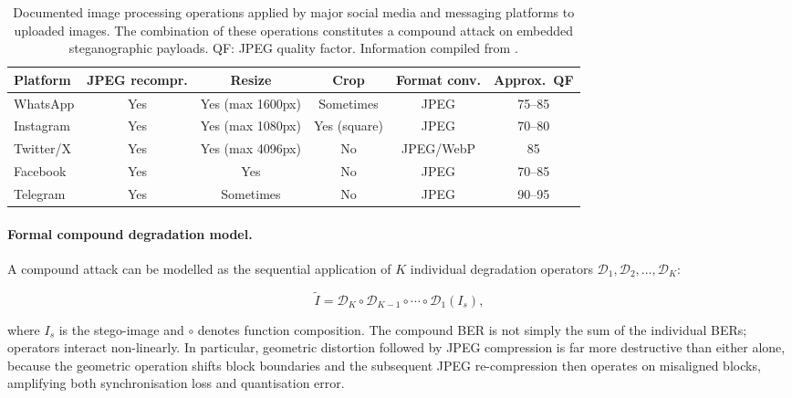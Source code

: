 \documentclass[12pt,a4paper,oneside]{report}
\begin{document}
	\begin{table}[htbp]
		\centering
		\caption{Documented image processing operations applied by major social media and messaging
			platforms to uploaded images. The combination of these operations constitutes a
			compound attack on embedded steganographic payloads. QF: JPEG quality factor.
			Information compiled from \cite{jia2021mbrs, wengrowski2019light,
				petitcolas1999information}.}
		\label{tab:platform_pipelines}
		\renewcommand{\arraystretch}{1.3}
		\small
		\begin{tabular}{@{} l c c c c c @{}}
			\toprule
			\textbf{Platform} & \textbf{JPEG recompr.} & \textbf{Resize} &
			\textbf{Crop} & \textbf{Format conv.} & \textbf{Approx.\ QF} \\
			\midrule
			WhatsApp   & Yes & Yes (max 1600px) & Sometimes & JPEG      & 75--85 \\
			Instagram  & Yes & Yes (max 1080px) & Yes (square) & JPEG   & 70--80 \\
			Twitter/X  & Yes & Yes (max 4096px) & No         & JPEG/WebP & 85     \\
			Facebook   & Yes & Yes              & No         & JPEG      & 70--85 \\
			Telegram   & Yes & Sometimes        & No         & JPEG      & 90--95 \\
			\bottomrule
		\end{tabular}
	\end{table}
	
	\paragraph{Formal compound degradation model.}
	A compound attack can be modelled as the sequential application of $K$ individual degradation
	operators $\mathcal{D}_1, \mathcal{D}_2, \ldots, \mathcal{D}_K$:
	
	\begin{equation}
		\tilde{I} = \mathcal{D}_K \circ \mathcal{D}_{K-1} \circ \cdots \circ \mathcal{D}_1 (I_s),
		\label{eq:compound}
	\end{equation}
	
	where $I_s$ is the stego-image and $\circ$ denotes function composition. The compound BER is
	not simply the sum of the individual BERs; operators interact non-linearly. In particular,
	geometric distortion followed by JPEG compression is far more destructive than either alone,
	because the geometric operation shifts block boundaries and the subsequent JPEG re-compression
	then operates on misaligned blocks, amplifying both synchronisation loss and quantisation error.
	
\end{document}
